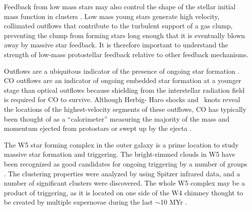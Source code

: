
Feedback from low mass stars may also control the shape of the stellar initial
mass function in clusters \citep{adams1996,Peters2010}.  Low mass young stars
generate high velocity, collimated outflows that contribute to the turbulent
support of a gas clump, preventing the clump from forming stars long enough
that it is eventually blown away by massive star feedback.  It is therefore
important to understand the strength of low-mass protostellar feedback relative
to other feedback mechanisms.

Outflows are a ubiquitous indicator of the presence of ongoing star formation
\citep{reipurth2001}.  CO outflows are an indicator of ongoing embedded star
formation at a younger stage than optical outflows because shielding from the
interstellar radiation field is required for CO to survive.  Although Herbig-
Haro shocks and \hh\ knots reveal the locations of the highest-velocity
segments of these outflows, CO has typically been thought of as a
``calorimeter'' measuring the majority of the mass and momentum ejected from
protostars or swept up by the ejecta \citep{Bachiller1996}.


The W5 star forming complex in the outer galaxy is a prime location to study
massive star formation and triggering.  The bright-rimmed clouds in W5 have
been recognized as good candidates for ongoing triggering by a number of groups
\citep{lefloch:cometary:1997,thompson:searching:2004,karr:triggered:2003}.  The
clustering properties were analyzed by \citet{koenig:clustered:2008} using
Spitzer infrared data, and a number of significant clusters were discovered.
The whole W5 complex may be a product of triggering, as it is located on one
side of the W4 chimney thought to be created by multiple supernovae during the
last $\sim$10 MYr \citep[][Figure \ref{fig:color_overview}]
{oey:hierarchical:2005}.  

